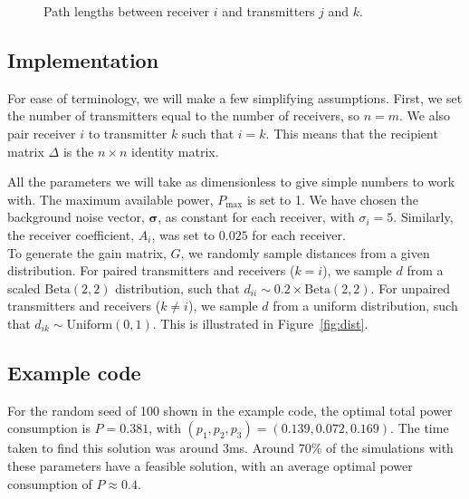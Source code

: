 \documentclass[twocolumn,secnumarabic,amssymb, nobibnotes, aps, prl,superscriptaddress]{revtex4-1}
\begin{document}
\begin{figure}[H]
\centering
{}
\caption{\label{fig:pathgain}Path lengths between receiver $i$ and transmitters $j$ and $k$.}
\end{figure}

\subsection{Implementation}
\noindent For ease of terminology, we will make a few simplifying assumptions.  First, we set the number of transmitters equal to the number of receivers, so $n=m$.  We also pair receiver $i$ to transmitter $k$ such that $i=k$.  This means that the recipient matrix $\Delta$ is the $n\times n$ identity matrix.

All the parameters we will take as dimensionless to give simple numbers to work with.  The maximum available power, $P_{\text{max}}$ is set to 1.  We have chosen the background noise vector, $\boldsymbol{\sigma}$, as constant for each receiver, with $\sigma_i = 5$.  Similarly, the receiver coefficient, $A_i$, was set to $0.025$ for each receiver. \\ 

To generate the gain matrix, $G$, we randomly sample distances from a given distribution.  For paired transmitters and receivers ($k=i$), we sample $d$ from a scaled $\text{Beta}(2,2)$ distribution, such that $d_{ii} \sim 0.2\times\text{Beta}(2,2)$.  For unpaired transmitters and receivers ($k\neq i$), we sample $d$ from a uniform distribution, such that $d_{ik} \sim \text{Uniform}(0,1)$.  This is illustrated in Figure~\ref{fig:dist}.

\subsection{Example code}
\noindent For the random seed of 100 shown in the example code, the optimal total power consumption is $P = 0.381$, with $(p_1,p_2,p_3) = (0.139, 0.072, 0.169)$.  The time taken to find this solution was around 3ms.  Around 70\% of the simulations with these parameters have a feasible solution, with an average optimal power consumption of $P\approx0.4$.
\end{document}

